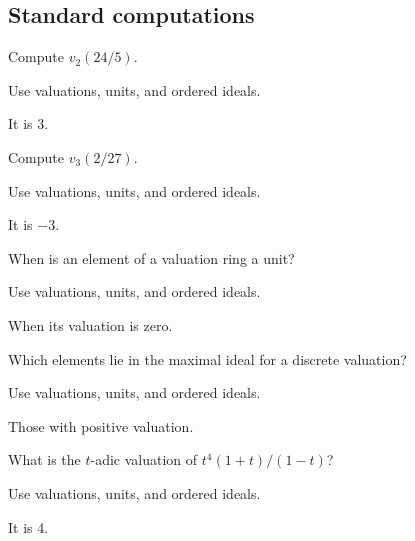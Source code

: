 \subsection*{Standard computations}

\begin{exercise}[Valuation]\label{exr:v21-expand-01}
Compute $v_2(24/5)$.
\end{exercise}
\begin{hint}
Use valuations, units, and ordered ideals.
\end{hint}
\begin{solution}
It is $3$.
\end{solution}

\begin{exercise}\label{exr:v21-expand-02}
Compute $v_3(2/27)$.
\end{exercise}
\begin{hint}
Use valuations, units, and ordered ideals.
\end{hint}
\begin{solution}
It is $-3$.
\end{solution}

\begin{exercise}\label{exr:v21-expand-03}
When is an element of a valuation ring a unit?
\end{exercise}
\begin{hint}
Use valuations, units, and ordered ideals.
\end{hint}
\begin{solution}
When its valuation is zero.
\end{solution}

\begin{exercise}\label{exr:v21-expand-04}
Which elements lie in the maximal ideal for a discrete valuation?
\end{exercise}
\begin{hint}
Use valuations, units, and ordered ideals.
\end{hint}
\begin{solution}
Those with positive valuation.
\end{solution}

\begin{exercise}\label{exr:v21-expand-05}
What is the $t$-adic valuation of $t^4(1+t)/(1-t)$?
\end{exercise}
\begin{hint}
Use valuations, units, and ordered ideals.
\end{hint}
\begin{solution}
It is $4$.
\end{solution}

